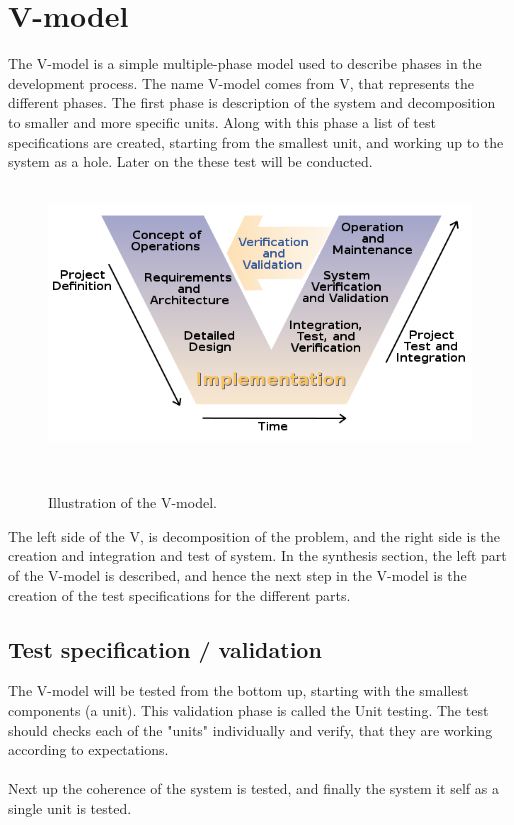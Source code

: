 \section{V-model}

%
%
%
%
%
%
%
%
%
%
%
%
%
%
%

The V-model is a simple multiple-phase model used to describe phases in the development process. 
The name V-model comes from V, that represents the different phases.
The first phase is description of the system and decomposition to smaller and more specific units.
Along with this phase a list of test specifications are created, starting from the smallest unit, and working up to the system as a hole.
Later on the these test will be conducted.
\\\\
\begin{figure}
\centering
\includegraphics[scale=0.5]{figures/20170215_V-model_image.png}
\caption{Illustration of the V-model. \cite{V-modelwiki}}\\ 
\end{figure}
The left side of the V, is decomposition of the problem, and the right side is the creation and integration and test of system.
In the synthesis section, the left part of the V-model is described, and hence the next step in the V-model is the creation of the test specifications for the different parts.
\subsection{Test specification / validation}
The V-model will be tested from the bottom up, starting with the smallest components (a unit). This validation phase is called the Unit testing. The test should checks each of the "units" individually and verify, that they are working according to expectations. \\\\
Next up the coherence of the system is tested, and finally the system it self as a single unit is tested. 
\\\\

